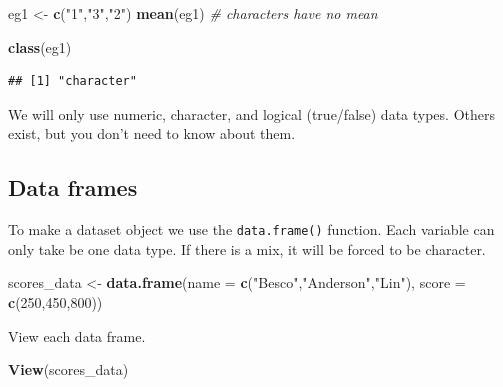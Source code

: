 \documentclass[
]{book}
\newenvironment{Shaded}{\begin{snugshade}}{\end{snugshade}}
\newcommand{\AttributeTok}[1]{\textcolor[rgb]{0.13,0.29,0.53}{#1}}
\newcommand{\CommentTok}[1]{\textcolor[rgb]{0.56,0.35,0.01}{\textit{#1}}}
\newcommand{\DecValTok}[1]{\textcolor[rgb]{0.00,0.00,0.81}{#1}}
\newcommand{\FunctionTok}[1]{\textcolor[rgb]{0.13,0.29,0.53}{\textbf{#1}}}
\newcommand{\NormalTok}[1]{#1}
\newcommand{\OtherTok}[1]{\textcolor[rgb]{0.56,0.35,0.01}{#1}}
\newcommand{\StringTok}[1]{\textcolor[rgb]{0.31,0.60,0.02}{#1}}
\begin{document}
\begin{Shaded}
\begin{Highlighting}[]
\NormalTok{eg1 }\OtherTok{\textless{}{-}} \FunctionTok{c}\NormalTok{(}\StringTok{"1"}\NormalTok{,}\StringTok{"3"}\NormalTok{,}\StringTok{"2"}\NormalTok{)}
\FunctionTok{mean}\NormalTok{(eg1) }\CommentTok{\# characters have no mean}
\end{Highlighting}
\end{Shaded}

\begin{Shaded}
\begin{Highlighting}[]
\FunctionTok{class}\NormalTok{(eg1)}
\end{Highlighting}
\end{Shaded}

\begin{verbatim}
## [1] "character"
\end{verbatim}

We will only use numeric, character, and logical (true/false) data types. Others exist, but you don't need to know about them.

\subsection*{Data frames}\label{data-frames}

To make a dataset object we use the \texttt{data.frame()} function. Each variable can only take be one data type. If there is a mix, it will be forced to be character.

\begin{Shaded}
\begin{Highlighting}[]
\NormalTok{scores\_data }\OtherTok{\textless{}{-}} \FunctionTok{data.frame}\NormalTok{(}\AttributeTok{name =} \FunctionTok{c}\NormalTok{(}\StringTok{"Besco"}\NormalTok{,}\StringTok{"Anderson"}\NormalTok{,}\StringTok{"Lin"}\NormalTok{),}
                  \AttributeTok{score =} \FunctionTok{c}\NormalTok{(}\DecValTok{250}\NormalTok{,}\DecValTok{450}\NormalTok{,}\DecValTok{800}\NormalTok{)) }
\end{Highlighting}
\end{Shaded}

View each data frame.

\begin{Shaded}
\begin{Highlighting}[]
\FunctionTok{View}\NormalTok{(scores\_data)}
\end{Highlighting}
\end{Shaded}
\end{document}
